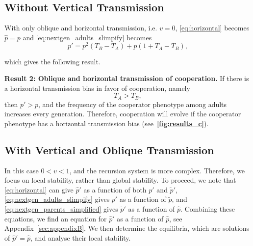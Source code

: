 \documentclass[12pt]{extarticle}
\begin{document}
\subsection*{Without Vertical Transmission}

With only oblique and horizontal transmission, i.e. $v = 0$, \autoref{eq:horizontal} becomes $\hat{p}=p$ and \autoref{eq:nextgen_adults_slimpify} becomes %
\begin{equation}  \label{eq:nextgen_parents_oblique_only}
p' = p^2 (T_B-T_A) + p (1+T_A-T_B) ,
\end{equation}

which gives the following result.

\textbf{Result 2: Oblique and horizontal transmission of cooperation.} 
If there is a horizontal transmission bias in favor of cooperation, namely
\begin{equation} \label{eq:oblique_only_result}
T_A > T_B, 
\end{equation}
then $p'>p$, and the frequency of the cooperator phenotype among adults increases every generation.
Therefore, cooperation will evolve if the cooperator phenotype has a horizontal transmission bias (see~\textbf{\autoref{fig:results_c}}).

\subsection*{With Vertical and Oblique Transmission}

In this case $0<v<1$, and the recursion system is more complex.
Therefore, we focus on local stability, rather than global stability.
To proceed, we note that 
\autoref{eq:horizontal} can give $\hat{p}'$ as a function of both $p'$ and $\tilde{p}'$,
\autoref{eq:nextgen_adults_slimpify} gives $p'$ as a function of $\tilde{p}$, and 
\autoref{eq:nextgen_parents_simplified} gives $\tilde{p}'$ as a function of $\hat{p}$. 
Combining these equations, we find an equation for $\hat{p}'$ as a function of $\hat{p}$, see Appendix~\autoref{sec:appendixB}.
We then determine the equilibria, which are solutions of $\hat{p}' = \hat{p}$, and analyse their local stability.
\end{document}
